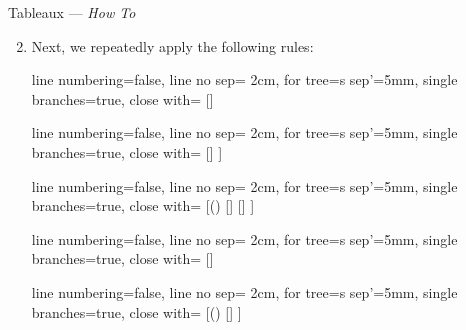 \begin{frame}{Tableaux --- \emph{How To}}

	\begin{enumerate}
	\setcounter{enumi}{1}
	
	\item Next, we repeatedly apply the following rules: 
					\vspace{2ex}
				
					\begin{center}
							{\tiny		
	
					\begin{prooftree}
					{
					line numbering=false,
					line no sep= 2cm,
					for tree={s sep'=5mm},
					single branches=true,
					close with=\xmark
					}
					[\neg\neg \phi [\phi ] ]
					\end{prooftree}
					\begin{prooftree}
					{
					line numbering=false,
					line no sep= 2cm,
					for tree={s sep'=5mm},
					single branches=true,
					close with=\xmark
					}
					[\phi\land\psi [\phi [\psi ] ] ]
					\end{prooftree}
					\begin{prooftree}
					{
					line numbering=false,
					line no sep= 2cm,
					for tree={s sep'=5mm},
					single branches=true,
					close with=\xmark
					}
					[\neg (\phi\land\psi) [\neg \phi ] [\neg \psi ] ]
					\end{prooftree}
					\begin{prooftree}
					{
					line numbering=false,
					line no sep= 2cm,
					for tree={s sep'=5mm},
					single branches=true,
					close with=\xmark
					}
					[\phi\lor\psi [\phi ] [\psi ] ]
					\end{prooftree}
					\begin{prooftree}
					{
					line numbering=false,
					line no sep= 2cm,
					for tree={s sep'=5mm},
					single branches=true,
					close with=\xmark
					}
					[\neg(\phi\lor\psi) [\neg\phi [\neg\psi ] ] ]
					\end{prooftree}

					\vspace{2ex}

}
\end{center}
\end{enumerate}
\end{frame}
